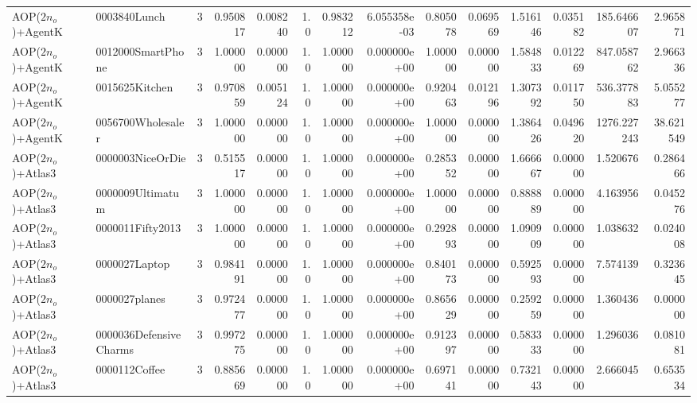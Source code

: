 \begin{tabular}{llrr|r|rr|rr|rr|rrr}
      AOP($2 n_o$)+AgentK &           0003840Lunch &       3 & 0.950817 & 0.008240 &  1.0 &      0.983212 & 6.055358e-03 &      0.805078 & 0.069569 &      1.516146 &    0.035182 &   185.646607 &    2.965871 \\
      AOP($2 n_o$)+AgentK &      0012000SmartPhone &       3 & 1.000000 & 0.000000 &  1.0 &      1.000000 & 0.000000e+00 &      1.000000 & 0.000000 &      1.584833 &    0.012269 &   847.058762 &    2.966336 \\
      AOP($2 n_o$)+AgentK &         0015625Kitchen &       3 & 0.970859 & 0.005124 &  1.0 &      1.000000 & 0.000000e+00 &      0.920463 & 0.012196 &      1.307392 &    0.011750 &   536.377883 &    5.055277 \\
      AOP($2 n_o$)+AgentK &      0056700Wholesaler &       3 & 1.000000 & 0.000000 &  1.0 &      1.000000 & 0.000000e+00 &      1.000000 & 0.000000 &      1.386426 &    0.049620 &  1276.227243 &   38.621549 \\
      AOP($2 n_o$)+Atlas3 &       0000003NiceOrDie &       3 & 0.515517 & 0.000000 &  1.0 &      1.000000 & 0.000000e+00 &      0.285352 & 0.000000 &      1.666667 &    0.000000 &     1.520676 &    0.286466 \\
      AOP($2 n_o$)+Atlas3 &       0000009Ultimatum &       3 & 1.000000 & 0.000000 &  1.0 &      1.000000 & 0.000000e+00 &      1.000000 & 0.000000 &      0.888889 &    0.000000 &     4.163956 &    0.045276 \\
      AOP($2 n_o$)+Atlas3 &       0000011Fifty2013 &       3 & 1.000000 & 0.000000 &  1.0 &      1.000000 & 0.000000e+00 &      0.292893 & 0.000000 &      1.090909 &    0.000000 &     1.038632 &    0.024008 \\
      AOP($2 n_o$)+Atlas3 &          0000027Laptop &       3 & 0.984191 & 0.000000 &  1.0 &      1.000000 & 0.000000e+00 &      0.840173 & 0.000000 &      0.592593 &    0.000000 &     7.574139 &    0.323645 \\
      AOP($2 n_o$)+Atlas3 &          0000027planes &       3 & 0.972477 & 0.000000 &  1.0 &      1.000000 & 0.000000e+00 &      0.865629 & 0.000000 &      0.259259 &    0.000000 &     1.360436 &    0.000000 \\
      AOP($2 n_o$)+Atlas3 & 0000036DefensiveCharms &       3 & 0.997275 & 0.000000 &  1.0 &      1.000000 & 0.000000e+00 &      0.912397 & 0.000000 &      0.583333 &    0.000000 &     1.296036 &    0.081081 \\
      AOP($2 n_o$)+Atlas3 &          0000112Coffee &       3 & 0.885669 & 0.000000 &  1.0 &      1.000000 & 0.000000e+00 &      0.697141 & 0.000000 &      0.732143 &    0.000000 &     2.666045 &    0.653534 \\

\end{tabular}
